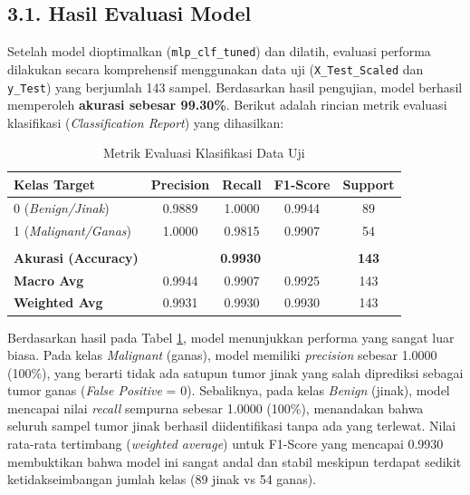 \documentclass[12pt, a4paper]{article}
\begin{document}
\subsection*{3.1. Hasil Evaluasi Model}
Setelah model dioptimalkan (\texttt{mlp\_clf\_tuned}) dan dilatih, evaluasi performa dilakukan secara komprehensif menggunakan data uji (\texttt{X\_Test\_Scaled} dan \texttt{y\_Test}) yang berjumlah 143 sampel. Berdasarkan hasil pengujian, model berhasil memperoleh \textbf{akurasi sebesar 99.30\%}. Berikut adalah rincian metrik evaluasi klasifikasi (\textit{Classification Report}) yang dihasilkan:

\begin{table}[H]
    \centering
    \caption{Metrik Evaluasi Klasifikasi Data Uji}
    \label{tab:classification_report}
    \vspace{0.2cm}
    \renewcommand{\arraystretch}{1.2}
    \begin{tabular}{|l|c|c|c|c|}
        \hline
        \textbf{Kelas Target}        & \textbf{Precision}                   & \textbf{Recall} & \textbf{F1-Score} & \textbf{Support} \\ \hline
        0 (\textit{Benign/Jinak})    & 0.9889                               & 1.0000          & 0.9944            & 89               \\ \hline
        1 (\textit{Malignant/Ganas}) & 1.0000                               & 0.9815          & 0.9907            & 54               \\ \hline
        \multicolumn{5}{|c|}{}                                                                                                       \\[-1em] \hline %
        \textbf{Akurasi (Accuracy)}  & \multicolumn{3}{c|}{\textbf{0.9930}} & \textbf{143}                                           \\ \hline
        \textbf{Macro Avg}           & 0.9944                               & 0.9907          & 0.9925            & 143              \\ \hline
        \textbf{Weighted Avg}        & 0.9931                               & 0.9930          & 0.9930            & 143              \\ \hline
    \end{tabular}
\end{table}

Berdasarkan hasil pada Tabel \ref{tab:classification_report}, model menunjukkan performa yang sangat luar biasa. Pada kelas \textit{Malignant} (ganas), model memiliki \textit{precision} sebesar 1.0000 (100\%), yang berarti tidak ada satupun tumor jinak yang salah diprediksi sebagai tumor ganas (\textit{False Positive} = 0). Sebaliknya, pada kelas \textit{Benign} (jinak), model mencapai nilai \textit{recall} sempurna sebesar 1.0000 (100\%), menandakan bahwa seluruh sampel tumor jinak berhasil diidentifikasi tanpa ada yang terlewat. Nilai rata-rata tertimbang (\textit{weighted average}) untuk F1-Score yang mencapai 0.9930 membuktikan bahwa model ini sangat andal dan stabil meskipun terdapat sedikit ketidakseimbangan jumlah kelas (89 jinak vs 54 ganas).
\end{document}
